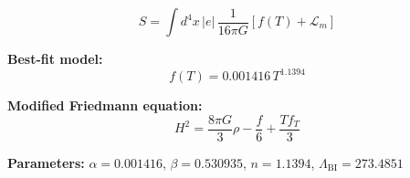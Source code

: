 
\begin{equation}
  S = \int d^4x \, |e| \, \frac{1}{16\pi G} \left[ f(T) + \mathcal{L}_m \right]
\end{equation}

\textbf{Best-fit model:}
\begin{equation}
  f(T) = 0.001416 \, T^{1.1394}
\end{equation}

\textbf{Modified Friedmann equation:}
\begin{equation}
  H^2 = \frac{8\pi G}{3} \rho - \frac{f}{6} + \frac{T f_T}{3}
\end{equation}

\textbf{Parameters:}
$\alpha = 0.001416$, \quad
$\beta = 0.530935$, \quad
$n = 1.1394$, \quad
$\Lambda_{\text{BI}} = 273.4851$